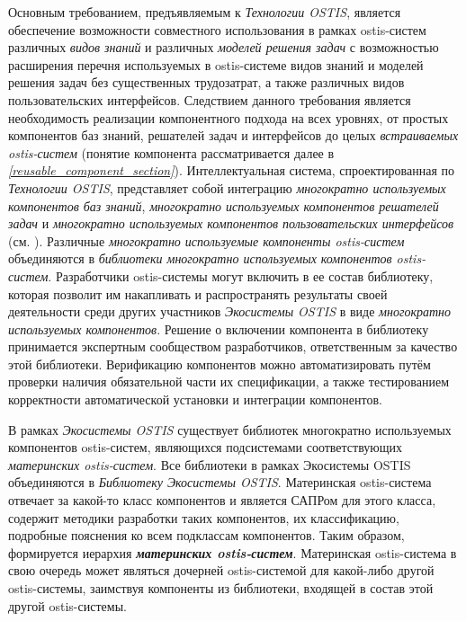 Основным требованием, предъявляемым к \textit{Технологии OSTIS}, является обеспечение возможности совместного использования в рамках ostis-систем различных \textit{видов знаний} и различных \textit{моделей решения задач} с возможностью  расширения перечня используемых в ostis-системе видов знаний и моделей решения задач без существенных трудозатрат, а также различных видов пользовательских интерфейсов. Следствием данного требования является необходимость реализации компонентного подхода на всех уровнях, от простых компонентов баз знаний, решателей задач и интерфейсов до целых \textit{встраиваемых ostis-систем} (понятие компонента рассматривается далее в \textit{\ref{reusable_component_section}}). Интеллектуальная система, спроектированная по \textit{Технологии OSTIS}, представляет собой интеграцию \textit{многократно используемых компонентов баз знаний}, \textit{многократно используемых компонентов решателей задач} и \textit{многократно используемых компонентов пользовательских интерфейсов} (см. ). Различные \textit{многократно используемые компоненты ostis-систем} объединяются в \textit{библиотеки многократно используемых компонентов ostis-систем}. Разработчики  ostis-системы могут включить в ее состав библиотеку, которая позволит им накапливать и распространять результаты своей деятельности среди других участников \textit{Экосистемы OSTIS} в виде \textit{многократно используемых компонентов}. Решение о включении компонента в библиотеку принимается экспертным сообществом разработчиков, ответственным за качество этой библиотеки. Верификацию компонентов можно автоматизировать путём проверки наличия обязательной части их спецификации, а также тестированием корректности автоматической установки и интеграции компонентов.

В рамках \textit{Экосистемы OSTIS} существует  библиотек многократно используемых компонентов ostis-систем, являющихся подсистемами соответствующих \textit{материнских ostis-систем}. Все библиотеки в рамках Экосистемы OSTIS объединяются в \textit{Библиотеку Экосистемы OSTIS}. Материнская ostis-система отвечает за какой-то класс компонентов и является САПРом для этого класса, содержит методики разработки таких компонентов, их классификацию, подробные пояснения ко всем подклассам компонентов. Таким образом, формируется иерархия \textbf{\textit{материнских ostis-систем}}. Материнская ostis-система в свою очередь может являться дочерней ostis-системой для какой-либо другой ostis-системы, заимствуя компоненты из библиотеки, входящей в состав этой другой ostis-системы.

